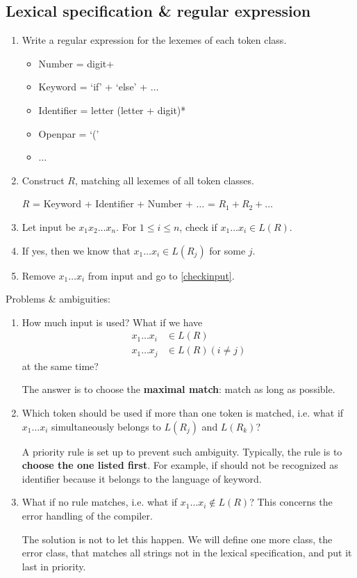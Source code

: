 \subsection{Lexical specification \& regular expression}
\begin{enumerate}
\item Write a regular expression for the lexemes of each token class.
\begin{itemize}
\item Number = digit+
\item Keyword = `if' + `else' + $\dots$
\item Identifier = letter (letter + digit)*
\item Openpar = `('
\item $\dots$
\end{itemize}
\item Construct $R$, matching all lexemes of all token classes.

$R$ = Keyword + Identifier + Number + $\dots$ = $R_1 + R_2 + \dots$
\item Let input be $x_1x_2\dots x_n$. For $1\le i\le n$, check if $x_1\dots x_i\in L(R)$.\label{checkinput}
\item If yes, then we know that $x_1\dots x_i\in L(R_j)$ for some $j$.
\item Remove $x_1\dots x_i$ from input and go to \ref{checkinput}.
\end{enumerate}
Problems \& ambiguities:
\begin{enumerate}
\item How much input is used? What if we have 
\begin{equation*}
\begin{split}
x_1\dots x_i&\in L(R)\\
x_1\dots x_j&\in L(R)(i\ne j)
\end{split}
\end{equation*}
at the same time? 

The answer is to choose the {\bf maximal match}: match as long as possible.
\item Which token should be used if more than one token is matched, i.e. what if $x_1\dots x_i$ simultaneously belongs to $L(R_j)$ and $L(R_k)$? 

A priority rule is set up to prevent such ambiguity. Typically, the rule is to {\bf choose the one listed first}. For example, {\sf if} should not be recognized as identifier because it belongs to the language of keyword.
\item What if no rule matches, i.e. what if $x_1\dots x_i\notin L(R)$? This concerns the error handling of the compiler.

The solution is not to let this happen. We will define one more class, the error class, that matches all strings not in the lexical specification, and put it last in priority.
\end{enumerate}
